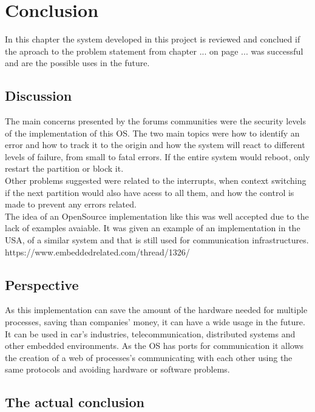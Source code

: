 \chapter{Conclusion}\label{ch:conclusion}

In this chapter the system developed in this project is reviewed and conclued if the aproach to the problem
 statement from chapter ... on page ... was successful and are the possible uses in the future.\\

\section{Discussion}
The main concerns presented by the forums communities were the security levels of the implementation of this 
OS. The two main topics were how to identify an error and how to track it to the origin and how the system
 will react to different levels of failure, from small to fatal errors. If the entire system would reboot,
  only restart the partition or block it.\\
 Other problems suggested were related to the interrupts, when context switching if the next partition would 
 also have acess to all them, and how the control is made to prevent any errors related.\\
The idea of an OpenSource implementation like this was well accepted due to the lack of examples avaiable. 
It was given an example of an implementation in the USA, of a similar system and that is still used for
communication infrastructures.
https://www.embeddedrelated.com/thread/1326/

\section{Perspective}

As this implementation can save the amount of the hardware needed for multiple processes, saving than
 companies' money, it can have a wide usage in the future. It can be used in car's industries, telecommunication, distributed systems and other embedded environments. 
 As the OS has ports for communication it allows the creation of a web of processes's communicating with 
 each other using the same protocols and avoiding hardware or software problems.
\\
\section{The actual conclusion}


